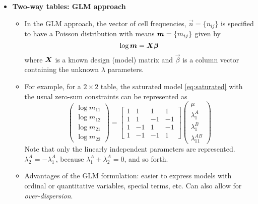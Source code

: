 \begin{frame}[allowframebreaks]
\end{frame}
\begin{frame}	
  \begin{itemize}
	\item{\large\bfseries \large\bfseries Two-way tables: GLM approach}
		\begin{itemize}
			\item In the GLM approach, the vector of cell frequencies, $\vec{n} = \{ n_{ij}\}$ is specified
			to have a \alert{Poisson} distribution with means $\bm{m} = \{m_{ij}\}$ given by
			\[ \log \bm{m} = \bm{X}  \bm{\beta}\]
			where $\bm{X}$ is a known design (model) matrix and $\vec{\beta}$ is a column vector
			containing the unknown $\lambda$ parameters.
			\item For example, for
a $2\times 2$ table, the saturated model \eqref{eq:saturated} with the usual zero-sum constraints
can be represented as
\begin{equation*}
\left(
\begin{array}{c}
\log m_{11} \\
\log m_{12} \\
\log m_{21} \\
\log m_{22}
\end{array}
\right) =\left[
\begin{array}{rrrr}
1 & 1 & 1 & 1 \\
1 & 1 & -1 & -1 \\
1 & -1 & 1 & -1 \\
1 & -1 & -1 & 1
\end{array}
\right] \left(
\begin{array}{c}
\mu  \\
\lambda _1^A \\
\lambda _1^B \\
\lambda _{11}^{AB}
\end{array}
\right)
\end{equation*}
Note that only the linearly independent parameters are represented.
$\lambda_2^A = - \lambda_1^A$, because $\lambda_1^A + \lambda_2^A =0$, 
and so forth.
		\item Advantages of the GLM formulation: easier
to express models with ordinal or quantitative variables, special terms, etc. 
Can also allow for \emph{over-dispersion}. 
		\end{itemize} 
  \end{itemize}
\end{frame}

